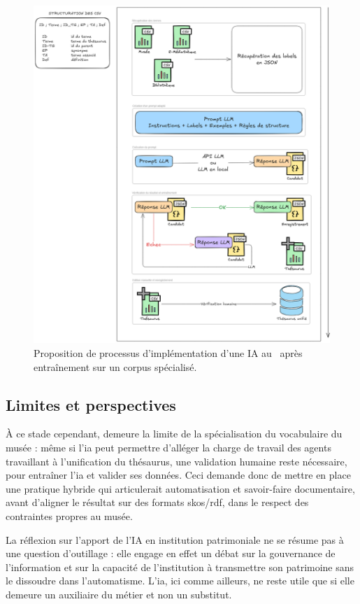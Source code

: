 \begin{figure}[htbp]
	\centering
	\includegraphics[width=0.7\linewidth]{img/SCHEM_processus_IA}
	\caption[Proposition de processus d'implémentation d'une IA au \mae]{Proposition de processus d'implémentation d'une IA au \mae~après entraînement sur un corpus spécialisé.}
	\label{fig:schemprocessusia}
\end{figure}



\subsection{Limites et perspectives}

À ce stade cependant, demeure la limite de la spécialisation du vocabulaire du musée : même si l'\ac{ia} peut permettre d'alléger la charge de travail des agents travaillant à l'unification du thésaurus, une validation humaine reste nécessaire, pour entraîner l'\ac{ia} et valider ses données. Ceci demande donc de mettre en place une pratique hybride qui articulerait automatisation et savoir-faire documentaire, avant d'aligner le résultat sur des formats \ac{skos}/\ac{rdf}, dans le respect des contraintes propres au musée.

La réflexion sur l’apport de l’IA en institution patrimoniale ne se résume pas à une question d’outillage : elle engage en effet un débat sur la gouvernance de l’information et sur la capacité de l’institution à transmettre son patrimoine sans le dissoudre dans l’automatisme. L'\ac{ia}, ici comme ailleurs, ne reste utile que si elle demeure un auxiliaire du métier et non un substitut. 